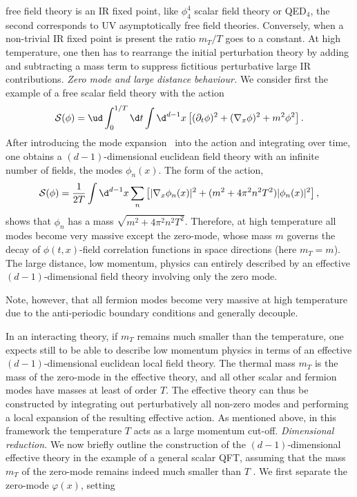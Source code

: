 free field theory is an IR fixed point, like $\phi^4_4$ scalar
field theory or QED${}_4$, the second corresponds to UV
asymptotically free field theories. Conversely, when a non-trivial
IR fixed point is present the ratio $m_T/T$ goes to a constant. At
high temperature, one then has  to rearrange the initial
perturbation theory  by adding and subtracting a mass term to
suppress fictitious perturbative large IR contributions.
\smallskip
{\it Zero mode and large distance behaviour.}
We consider first the example of a free scalar field
theory with the action
$${\cal S}(\phi)=\ud\int_0^{1/T}\d t\int\d^{d-1} x\left[ ( \partial _t \phi)^2+ (\nabla _x\phi )^2+m^2\phi^2\right]. $$
After introducing the mode expansion \emodexp\ into the action and integrating over time, one obtains a $(d-1)$-dimensional euclidean field theory with an infinite number of fields, the modes $\phi_n(x)$. The form of the action,
$${\cal S}(\phi)={1\over 2T}\int\d^{d-1} x\sum_n\left[|\nabla _x\phi_n (x)|^2+
(m^2+4\pi^2n^2 T^2)|\phi_n(x) |^2\right],$$ shows that $\phi_n$
has a mass $\sqrt{m^2+4\pi^2n^2T^2}$. Therefore, at high
temperature all modes become very massive except the zero-mode,
whose mass $m$ governs the decay of $\phi(t,x)$-field correlation
functions in space directions (here $m_T=m$). The large distance,
low momentum, physics can entirely described by an effective
$(d-1)$-dimensional field theory involving only the zero mode.
\par Note, however, that all
fermion modes  become very massive at high  temperature due to the
anti-periodic boundary conditions \efmodexp and generally
decouple.
\par In an interacting theory, if
$m_T$ remains much smaller than the temperature, one expects still
to be able to describe low momentum physics in terms of an
effective $(d-1)$-dimensional euclidean local field theory. The
thermal mass $m_T$ is the mass of the zero-mode in the effective
theory, and all other scalar and fermion modes have masses at
least of order $T$. The effective theory can thus be constructed
by integrating out perturbatively all non-zero modes and
performing a local expansion of the resulting effective action. As
mentioned above, in this framework the temperature $T$ acts as a
large momentum cut-off.
\medskip
{\it Dimensional reduction.}
We now briefly outline the construction of the $(d-1)$-dimensional effective theory in the example of a general scalar QFT, assuming that the mass $m_T$ of the zero-mode remains indeed much smaller than $T$ .  We first separate the zero-mode $\varphi(x)$, setting
